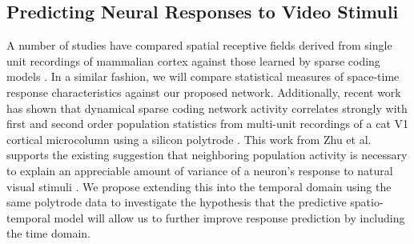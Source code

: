 \documentclass[smallextended]{svjour3}       %
\begin{document}
\subsection{Predicting Neural Responses to Video Stimuli}
\noindent A number of studies have compared spatial receptive fields derived from single unit recordings of mammalian cortex against those learned by sparse coding models \cite{olshausen1996emergence,rehn2007network,zhu2013visual,zylberberg2011sparse}. In a similar fashion, we will compare statistical measures of space-time response characteristics against our proposed network. Additionally, recent work has shown that dynamical sparse coding network activity correlates strongly with first and second order population statistics from multi-unit recordings of a cat V1 cortical microcolumn using a silicon polytrode \cite{zhu2015sparse}. This work from Zhu et al. supports the existing suggestion that neighboring population activity is necessary to explain an appreciable amount of variance of a neuron's response to natural visual stimuli \cite{haslinger2012context,koster2013modeling,koster2014modeling}. We propose extending this into the temporal domain using the same polytrode data to investigate the hypothesis that the predictive spatio-temporal model will allow us to further improve response prediction by including the time domain.
\end{document}
